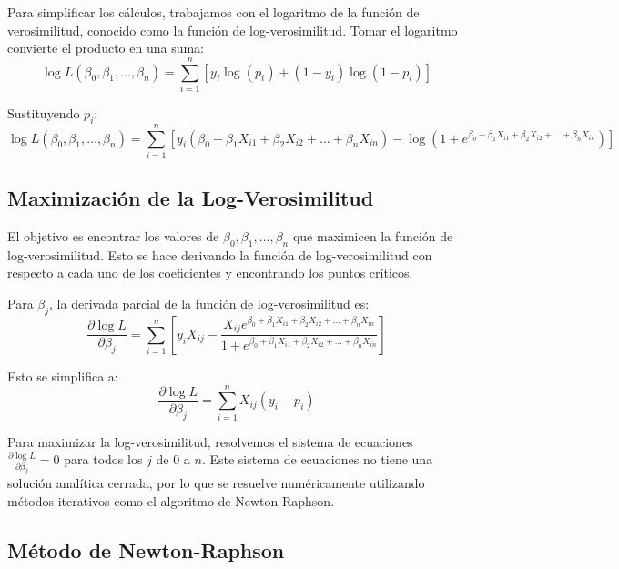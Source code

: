 Para simplificar los cálculos, trabajamos con el logaritmo de la función de verosimilitud, conocido como la función de log-verosimilitud. Tomar el logaritmo convierte el producto en una suma:
\begin{equation}
\log L(\beta_0, \beta_1, \ldots, \beta_n) = \sum_{i=1}^{n} \left[ y_i \log(p_i) + (1 - y_i) \log(1 - p_i) \right]
\end{equation}

Sustituyendo $p_i$:
\begin{equation}
\log L(\beta_0, \beta_1, \ldots, \beta_n) = \sum_{i=1}^{n} \left[ y_i (\beta_0 + \beta_1 X_{i1} + \beta_2 X_{i2} + \ldots + \beta_n X_{in}) - \log(1 + e^{\beta_0 + \beta_1 X_{i1} + \beta_2 X_{i2} + \ldots + \beta_n X_{in}}) \right]
\end{equation}

\subsection*{Maximización de la Log-Verosimilitud}

El objetivo es encontrar los valores de $\beta_0, \beta_1, \ldots, \beta_n$ que maximicen la función de log-verosimilitud. Esto se hace derivando la función de log-verosimilitud con respecto a cada uno de los coeficientes y encontrando los puntos críticos.

Para $\beta_j$, la derivada parcial de la función de log-verosimilitud es:
\begin{equation}
\frac{\partial \log L}{\partial \beta_j} = \sum_{i=1}^{n} \left[ y_i X_{ij} - \frac{X_{ij} e^{\beta_0 + \beta_1 X_{i1} + \beta_2 X_{i2} + \ldots + \beta_n X_{in}}}{1 + e^{\beta_0 + \beta_1 X_{i1} + \beta_2 X_{i2} + \ldots + \beta_n X_{in}}} \right]
\end{equation}

Esto se simplifica a:
\begin{equation}
\frac{\partial \log L}{\partial \beta_j} = \sum_{i=1}^{n} X_{ij} (y_i - p_i)
\end{equation}

Para maximizar la log-verosimilitud, resolvemos el sistema de ecuaciones $\frac{\partial \log L}{\partial \beta_j} = 0$ para todos los $j$ de 0 a $n$. Este sistema de ecuaciones no tiene una solución analítica cerrada, por lo que se resuelve numéricamente utilizando métodos iterativos como el algoritmo de Newton-Raphson.

\subsection*{Método de Newton-Raphson}


